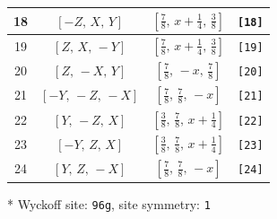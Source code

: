 \documentclass[fleqn,8pt]{jsarticle}
\begin{document}
\begin{longtable}{cccc}
18 & $\left[ - Z,\, X,\, Y \right]$ & $\left[ \frac{7}{8},\, x + \frac{1}{4},\, \frac{3}{8} \right]$ & {\tt [18]} \\ \hline
19 & $\left[ Z,\, X,\, - Y \right]$ & $\left[ \frac{7}{8},\, x + \frac{1}{4},\, \frac{3}{8} \right]$ & {\tt [19]} \\ \hline
20 & $\left[ Z,\, - X,\, Y \right]$ & $\left[ \frac{7}{8},\, - x,\, \frac{7}{8} \right]$ & {\tt [20]} \\ \hline
21 & $\left[ - Y,\, - Z,\, - X \right]$ & $\left[ \frac{7}{8},\, \frac{7}{8},\, - x \right]$ & {\tt [21]} \\ \hline
22 & $\left[ Y,\, - Z,\, X \right]$ & $\left[ \frac{3}{8},\, \frac{7}{8},\, x + \frac{1}{4} \right]$ & {\tt [22]} \\ \hline
23 & $\left[ - Y,\, Z,\, X \right]$ & $\left[ \frac{3}{8},\, \frac{7}{8},\, x + \frac{1}{4} \right]$ & {\tt [23]} \\ \hline
24 & $\left[ Y,\, Z,\, - X \right]$ & $\left[ \frac{7}{8},\, \frac{7}{8},\, - x \right]$ & {\tt [24]} \\
\end{longtable}
* Wyckoff site: {\tt 96g}, site symmetry: {\tt 1}
\renewcommand{\arraystretch}{1.2}
\end{document}
